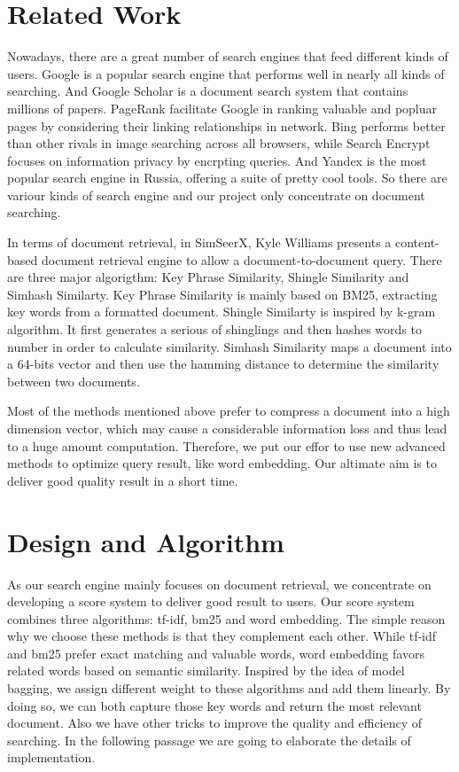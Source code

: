 \documentclass{article}
\begin{document}
\section{Related Work}
Nowadays, there are a great number of search engines that feed different kinds of users. Google is a popular search engine that performs well in nearly all kinds of searching. And Google Scholar is a document search system that contains millions of papers. PageRank facilitate Google in ranking valuable and popluar pages by considering their linking relationships in network. Bing performs better than other rivals in image searching across all browsers, while Search Encrypt focuses on information privacy by encrpting queries. And Yandex is the most popular search engine in Russia, offering a suite of pretty cool tools. So there are variour kinds of search engine and our project only concentrate on document searching.

In terms of document retrieval, in SimSeerX, Kyle Williams presents a content-based document retrieval engine to allow a document-to-document query. There are three major algorigthm: Key Phrase Similarity, Shingle Similarity and Simhash Similarty. Key Phrase Similarity is mainly based on BM25, extracting key words from a formatted document. Shingle Similarty is inspired by k-gram algorithm. It first generates a serious of shinglings and then hashes words to number in order to calculate similarity. Simhash Similarity maps a document into a 64-bits vector and then use the hamming distance to determine the similarity between two documents. 

Most of the methods mentioned above prefer to compress a document into a high dimension vector, which may cause a considerable information loss and thus lead to a huge amount computation. Therefore, we put our effor to use new advanced methods to optimize query result, like word embedding. Our altimate aim is to deliver good quality result in a short time.


\section{Design and Algorithm}
As our search engine mainly focuses on document retrieval, we concentrate on developing a score system to deliver good result to users. Our score system combines three algorithms: tf-idf, bm25 and word embedding. The simple reason why we choose these methods is that they complement each other. While tf-idf and bm25 prefer exact matching and valuable words, word embedding favors related words based on semantic similarity. Inspired by the idea of model bagging, we assign different weight to these algorithms and add them linearly. By doing so, we can both capture those key words and return the most relevant document. Also we have other tricks to improve the quality and efficiency of searching. In the following passage we are going to elaborate the details of implementation.
 
\end{document}
